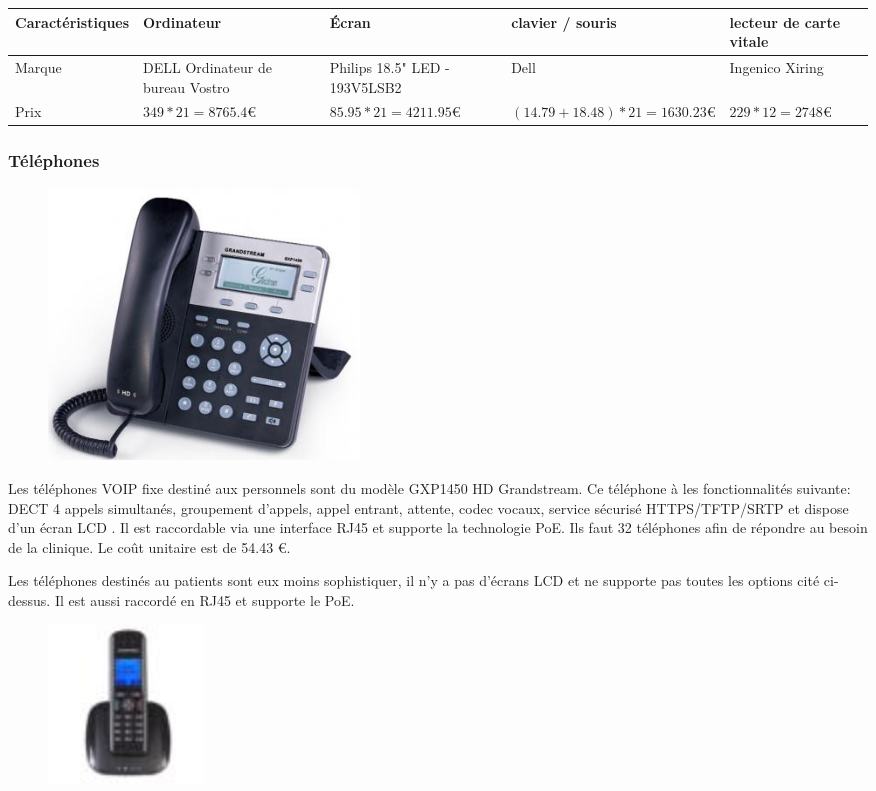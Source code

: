     \begin{center}
        \begin{tabular}{|l|p{2cm}|p{2cm}|p{2cm}|p{2cm}|}
          \hline
            Caractéristiques  & Ordinateur & Écran & clavier / souris & lecteur de carte vitale \\
          \hline
            Marque  & DELL Ordinateur de bureau Vostro & Philips 18.5" LED - 193V5LSB2 & Dell & Ingenico Xiring \\
        \hline
            Prix &
$ 349 * 21 = 8765.4  \euro   $
    &
$ 85.95 * 21 = 4211.95  \euro   $
    &
$ (14.79 + 18.48) * 21 = 1630.23  \euro   $
    &
$ 229 * 12 = 2748  \euro   $
 \\
          \hline
        \end{tabular}
    \end{center}



\subsubsection{Téléphones}

\begin{figure}[!ht]
    \center
    \includegraphics[width=0.4\textwidth]{./images/29.png}
\end{figure}

Les téléphones VOIP fixe destiné aux personnels sont du modèle GXP1450 HD Grandstream.
Ce téléphone à les fonctionnalités suivante: DECT 4 appels simultanés, groupement d'appels, appel entrant, attente, codec vocaux, service sécurisé HTTPS/TFTP/SRTP et dispose d'un écran LCD . Il est raccordable via une interface RJ45 et supporte la technologie PoE. Ils faut 32 téléphones afin de répondre au besoin de la clinique. Le coût unitaire est de 54.43  \euro.

Les téléphones destinés au patients sont eux moins sophistiquer, il n'y a pas d'écrans LCD et ne supporte pas toutes les options cité ci-dessus. Il est aussi raccordé en RJ45 et supporte le PoE.

\begin{figure}[!ht]
    \center
    \includegraphics[width=0.2\textwidth]{./images/31.png}
\end{figure}

